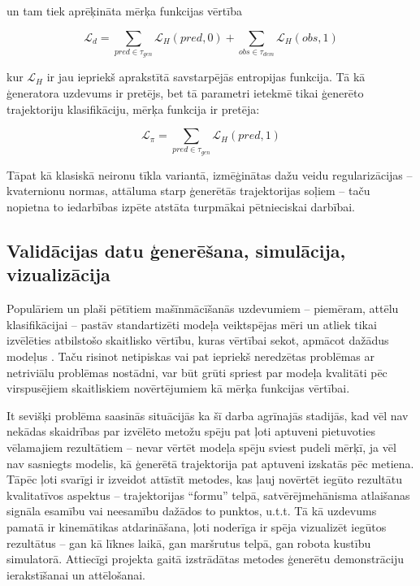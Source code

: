 \documentclass[12pt, a4paper]{article}
\numberwithin{equation}{section} %
\begin{document}
un tam tiek aprēķināta mērķa funkcijas vērtība 

\begin{equation}
    \mathcal{L}_{d} = \sum_{pred \in \tau_{gen}} \mathcal{L}_H(pred,0) + 
    \sum_{obs \in \tau_{dem}} \mathcal{L}_H(obs,1) 
\end{equation}

kur $\mathcal{L}_H$ ir jau iepriekš aprakstītā savstarpējās entropijas funkcija. Tā kā ģeneratora uzdevums ir pretējs, bet tā parametri ietekmē tikai ģenerēto trajektoriju klasifikāciju, mērķa funkcija ir pretēja:

\begin{equation}
    \mathcal{L}_{\pi} = \sum_{pred \in \tau_{gen}} \mathcal{L}_H(pred,1) 
\end{equation}

Tāpat kā klasiskā neironu tīkla variantā, izmēģinātas dažu veidu regularizācijas -- kvaternionu normas, attāluma starp ģenerētās trajektorijas soļiem -- taču nopietna to iedarbības izpēte atstāta turpmākai pētnieciskai darbībai.

\subsection{Validācijas datu ģenerēšana, simulācija, vizualizācija}

Populāriem un plaši pētītiem mašīnmācīšanās uzdevumiem -- piemēram, attēlu klasifikācijai -- pastāv standartizēti modeļa veiktspējas mēri un atliek tikai izvēlēties atbilstošo skaitlisko vērtību, kuras vērtībai sekot, apmācot dažādus modeļus \cite{tf_img_tutorial}. Taču risinot netipiskas vai pat iepriekš neredzētas problēmas ar netriviālu problēmas nostādni, var būt grūti spriest par modeļa kvalitāti pēc virspusējiem skaitliskiem novērtējumiem kā mērķa funkcijas vērtībai. 

It sevišķi problēma saasinās situācijās ka šī darba agrīnajās stadijās, kad vēl nav nekādas skaidrības par izvēlēto metožu spēju pat ļoti aptuveni pietuvoties vēlamajiem rezultātiem -- nevar vērtēt modeļa spēju sviest pudeli mērķī, ja vēl nav sasniegts modelis, kā ģenerētā trajektorija pat aptuveni izskatās pēc metiena. Tāpēc ļoti svarīgi ir izveidot attīstīt metodes, kas ļauj novērtēt iegūto rezultātu kvalitatīvos aspektus -- trajektorijas ``formu'' telpā, satvērējmehānisma atlaišanas signāla esamību vai neesamību dažādos to punktos, u.t.t. Tā kā uzdevums pamatā ir kinemātikas atdarināšana, ļoti noderīga ir spēja vizualizēt iegūtos rezultātus -- gan kā līknes laikā, gan maršrutus telpā, gan robota kustību simulatorā. Attiecīgi projekta gaitā izstrādātas metodes ģenerētu demonstrāciju ierakstīšanai un attēlošanai.
\end{document}
